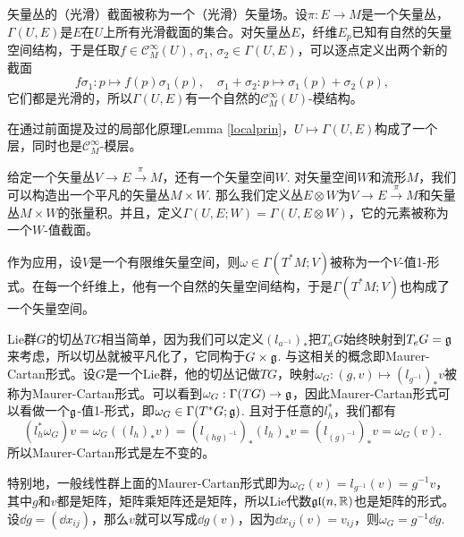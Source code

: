 
\begin{para}[矢量丛的截面层]
	矢量丛的（光滑）截面被称为一个（光滑）矢量场。设$\pi:E\to M$是一个矢量丛，$\Gamma(U,E)$是$E$在$U$上所有光滑截面的集合。对矢量丛$E$，纤维$E_p$已知有自然的矢量空间结构，于是任取$f\in \mathcal C^\infty_M(U)$, $\sigma_1$, $\sigma_2\in \Gamma(U,E)$，可以逐点定义出两个新的截面
	\[
		f\sigma_1:p\mapsto f(p)\sigma_1(p),\quad \sigma_1+\sigma_2:p\mapsto \sigma_1(p)+\sigma_2(p),
	\]
	它们都是光滑的，所以$\Gamma(U,E)$有一个自然的$\mathcal C^\infty_M(U)$-模结构。
\end{para}
	
在通过前面提及过的局部化原理Lemma \ref{localprin}，$U\mapsto \Gamma(U,E)$构成了一个层，同时也是$\mathcal C^\infty_M$-模层。

\begin{para}[矢量值截面]
	给定一个矢量丛$V\to E\xrightarrow{\pi} M$，还有一个矢量空间$W$. 对矢量空间$W$和流形$M$，我们可以构造出一个平凡的矢量丛$M\times W$. 那么我们定义丛$E\otimes W$为$V\to E\xrightarrow{\pi} M$和矢量丛$M\times W$的张量积。并且，定义$\Gamma(U,E;W)=\Gamma(U,E\otimes W)$，它的元素被称为一个$W$-值截面。
	\end{para}
	
	作为应用，设$V$是一个有限维矢量空间，则$\omega\in \Gamma(T^*M;V)$被称为一个$V$-值1-形式。在每一个纤维上，他有一个自然的矢量空间结构，于是$\Gamma(T^*M;V)$也构成了一个矢量空间。
	
	\begin{para}[Lie群的切丛]
	Lie群$G$的切丛$TG$相当简单，因为我们可以定义$(l_{a^{-1}})_*$把$T_aG$始终映射到$T_eG={\mathfrak{g}}$来考虑，所以切丛就被平凡化了，它同构于$G\times {\mathfrak{g}}$. 与这相关的概念即Maurer-Cartan形式。设$G$是一个Lie群，他的切丛记做$TG$，映射$\omega_G:(g,v)\mapsto (l_{g^{-1}})_*v$被称为Maurer-Cartan形式。可以看到$\omega_G:\Gamma(TG)\to {\mathfrak{g}}$，因此Maurer-Cartan形式可以看做一个${\mathfrak{g}}$-值1-形式，即$\omega_G\in \Gamma(T^*G;{\mathfrak{g}})$. 且对于任意的$l_h^*$，我们都有
	\[
		(l_h^*\omega_G)v=\omega_G((l_h)_*v)=(l_{(hg)^{-1}})_*(l_h)_*v=(l_{(g)^{-1}})_*v=\omega_G(v).
	\]
	所以Maurer-Cartan形式是左不变的。
	
	特别地，一般线性群上面的Maurer-Cartan形式即为$\omega_G(v)=l_{g^{-1}}(v)=g^{-1}v$，其中$g$和$v$都是矩阵，矩阵乘矩阵还是矩阵，所以Lie代数$\mathfrak{gl}(n,\mathbb{R})$也是矩阵的形式。设$\dd g=(\dd x_{ij})$，那么$v$就可以写成$\dd g(v)$，因为$\dd x_{ij}(v)=v_{ij}$，则$\omega_G=g^{-1}\dd g$.
	\end{para}

